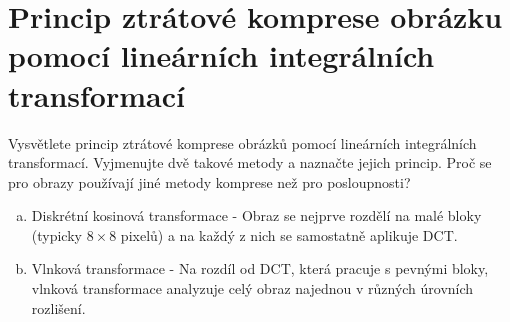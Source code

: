\section{Princip ztrátové komprese obrázku pomocí lineárních integrálních transformací}
Vysvětlete princip ztrátové komprese obrázků pomocí lineárních integrálních transformací. Vyjmenujte dvě takové 
metody a naznačte jejich princip. Proč se pro obrazy používají jiné metody komprese než pro posloupnosti?

\begin{enumerate}[a)]
    \item Diskrétní kosinová transformace - Obraz se nejprve rozdělí na malé bloky (typicky $8 \times 8$ pixelů) a na 
    každý z nich se samostatně aplikuje DCT.
    \item Vlnková transformace - Na rozdíl od DCT, která pracuje s pevnými bloky, vlnková transformace analyzuje celý 
    obraz najednou v různých úrovních rozlišení.
\end{enumerate}